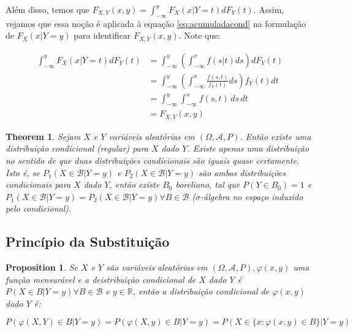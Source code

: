 \documentclass[
]{article}
\newtheorem{theorem}{Theorem}[section]
\newtheorem{proposition}{Proposition}[section]
\theoremstyle{definition}
\theoremstyle{definition}
\theoremstyle{definition}
\theoremstyle{definition}
\theoremstyle{remark}
\begin{document}
Além disso, temos que \(F_{X,Y}(x,y) = \int_{-\infty}^{y}F_{X}(x|Y = t)dF_{Y}(t)\). Assim, vejamos que essa noção é aplicada à equação \eqref{eq:acumuladacond} na formulação de \(F_{X}(x|Y = y)\) para identificar \(F_{X,Y}(x,y)\). Note que:

\begin{align*}
\int_{-\infty}^{y}F_{X}(x|Y = t)dF_{Y}(t) &= \int_{-\infty}^{y}\left(\int_{-\infty}^{x}f(s|t)ds\right)dF_{Y}(t) \\
&= \int_{-\infty}^{y}\left(\int_{-\infty}^{x}\frac{f(s,t)}{f_{Y}(t)}ds\right)f_{Y}(t)dt \\
&= \int_{-\infty}^{y}\int_{-\infty}^{x}f(s,t) \, ds\, dt \\
&= F_{X,Y}(x,y)
\end{align*}

\begin{theorem}
Sejam \(X\) e \(Y\) variáveis aleatórias em \((\Omega, \mathcal{A}, P)\). Então existe uma distribuição condicional (regular) para \(X\) dado \(Y\). Existe apenas uma distribuição no sentido de que duas distribuições condicionais são iguais quase certamente. Isto é, se \(P_{1}(X \in \mathcal{B}|Y = y)\) e \(P_{2}(X \in \mathcal{B}|Y = y)\) são ambas distribuições condicionais para \(X\) dado \(Y\), então existe \(B_{0}\) boreliano, tal que \(P(Y \in B_{0}) = 1\) e \(P_{1}(X \in \mathcal{B}|Y = y) = P_{2}(X \in \mathcal{B}|Y = y) \forall B \in \mathcal{B}\) (\(\sigma\)-álgebra no espaço induzido pelo condicional).
\end{theorem}

\hypertarget{princuxedpio-da-substituiuxe7uxe3o}{%
\subsection{Princípio da Substituição}\label{princuxedpio-da-substituiuxe7uxe3o}}

\begin{proposition}
Se \(X\) e \(Y\) são variáveis aleatórias em \((\Omega, \mathcal{A}, P), \varphi(x,y)\) uma função mensurável e a deistribuição condicional de \(X\) dado \(Y\) é \(P(X \in B|Y = y) \forall B \in \mathcal{B}\) e \(y \in \mathbb{R}\), então a distribuição condicional de \(\varphi(x,y)\) dado \(Y\) é:

\begin{equation*}
P(\varphi(X,Y) \in B|Y = y) = P(\varphi(X,y) \in B|Y = y) = P(X \in \{x : \varphi(x,y) \in B\}|Y = y)
\end{equation*}
\end{proposition}
\end{document}
